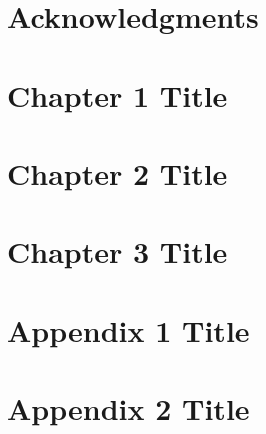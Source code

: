 \begin{abstract}
    
\end{abstract}

\chapter*{Acknowledgments}


\tableofcontents
\newpage

\chapter{Chapter 1 Title}


\chapter{Chapter 2 Title}


\chapter{Chapter 3 Title}


\appendix
\chapter{Appendix 1 Title}


\chapter{Appendix 2 Title}


\newpage




